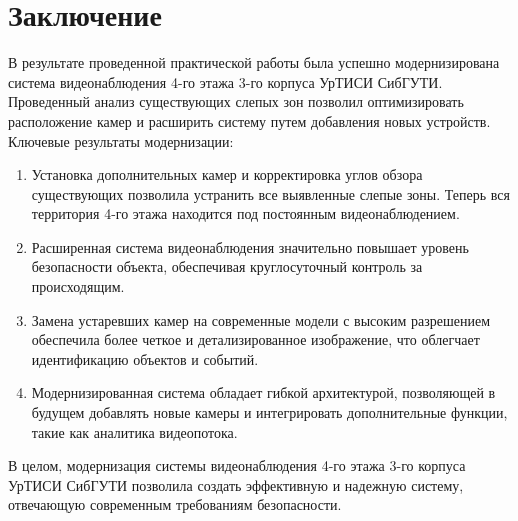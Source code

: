 \section*{Заключение}

В результате проведенной практической работы была успешно модернизирована система видеонаблюдения 
4-го этажа 3-го корпуса УрТИСИ СибГУТИ. Проведенный анализ существующих слепых зон позволил оптимизировать 
расположение камер и расширить систему путем добавления новых устройств.
Ключевые результаты модернизации:
\begin{enumerate}
    \item Установка дополнительных камер и корректировка углов обзора существующих позволила устранить все выявленные слепые зоны. Теперь вся территория 4-го этажа находится под постоянным видеонаблюдением.
    \item Расширенная система видеонаблюдения значительно повышает уровень безопасности объекта, обеспечивая круглосуточный контроль за происходящим.
    \item Замена устаревших камер на современные модели с высоким разрешением обеспечила более четкое и детализированное изображение, что облегчает идентификацию объектов и событий.
    \item Модернизированная система обладает гибкой архитектурой, позволяющей в будущем добавлять новые камеры и интегрировать дополнительные функции, такие как аналитика видеопотока.
\end{enumerate}
В целом, модернизация системы видеонаблюдения 4-го этажа 3-го корпуса УрТИСИ СибГУТИ позволила создать эффективную и надежную систему, отвечающую современным требованиям безопасности.
